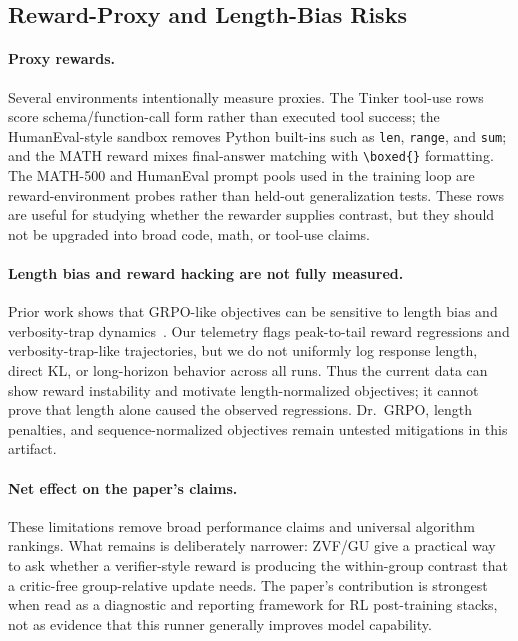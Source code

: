 \subsection{Reward-Proxy and Length-Bias Risks}
\label{sec:length_bias}

\paragraph{Proxy rewards.}
Several environments intentionally measure proxies.  The Tinker tool-use rows
score schema/function-call form rather than executed tool success; the
HumanEval-style sandbox removes Python built-ins such as \texttt{len},
\texttt{range}, and \texttt{sum}; and the MATH reward mixes final-answer matching
with \texttt{\textbackslash boxed\{\}} formatting.  The MATH-500 and HumanEval
prompt pools used in the training loop are reward-environment probes rather
than held-out generalization tests.  These rows are useful for studying whether
the rewarder supplies contrast, but they should not be upgraded into broad code,
math, or tool-use claims.

\paragraph{Length bias and reward hacking are not fully measured.}
Prior work shows that GRPO-like objectives can be sensitive to length bias and
verbosity-trap dynamics~\citep{tong2025drgrpo}.  Our telemetry
flags peak-to-tail reward regressions and verbosity-trap-like trajectories, but
we do not uniformly log response length, direct KL, or long-horizon behavior
across all runs.  Thus the current data can show reward instability and motivate
length-normalized objectives; it cannot prove that length alone caused the
observed regressions.  Dr.~GRPO, length penalties, and sequence-normalized
objectives remain untested mitigations in this artifact.

\paragraph{Net effect on the paper's claims.}
These limitations remove broad performance claims and universal algorithm
rankings.  What remains is deliberately narrower: ZVF/GU give a practical way to
ask whether a verifier-style reward is producing the within-group contrast that
a critic-free group-relative update needs.  The paper's contribution is strongest
when read as a diagnostic and reporting framework for RL post-training
stacks, not as evidence that this runner generally improves model capability.

